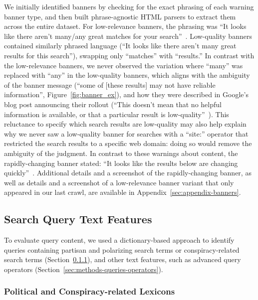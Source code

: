 We initially identified banners by checking for the exact phrasing of each warning banner type, and then built phrase-agnostic HTML parsers to extract them across the entire dataset. 
For low-relevance banners, the phrasing was ``It looks like there aren't many/any great matches for your search''~\citep{tucker2020getting}. 
Low-quality banners contained similarly phrased language (``It looks like there aren't many great results for this search''), swapping only ``matches'' with ``results.'' 
In contrast with the low-relevance banners, we never observed the variation where ``many'' was replaced with ``any'' in the low-quality banners, which aligns with the ambiguity of the banner message (``some of [these results] may not have reliable information'', Figure~\ref{fig:banner_ex}), and how they were described in Google's blog post announcing their rollout (``This doesn't mean that no helpful information is available, or that a particular result is low-quality''~\cite{nayak2022new}).
This reluctance to specify which search results are low-quality may also help explain why we never saw a low-quality banner for searches with a ``site:'' operator that restricted the search results to a specific web domain: doing so would remove the ambiguity of the judgment.
In contrast to these warnings about content, the rapidly-changing banner stated: ``It looks like the results below are changing quickly''~\citep{sullivan2021new}.
Additional details and a screenshot of the rapidly-changing banner, as well as details and a screenshot of a low-relevance banner variant that only appeared in our last crawl, are available in Appendix~\ref{sec:appendix-banners}.

\subsection{Search Query Text Features} 
\label{sec:methods-queries}

To evaluate query content, we used a dictionary-based approach to identify queries containing partisan and polarizing search terms or conspiracy-related search terms (Section~\ref{sec:methods-queries-polcon}), and other text features, such as advanced query operators (Section~\ref{sec:methods-queries-operators}).

\subsubsection{Political and Conspiracy-related Lexicons} 
\label{sec:methods-queries-polcon}

